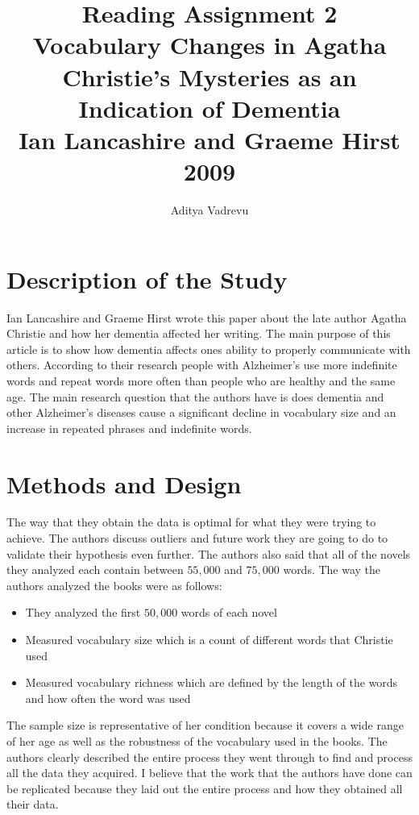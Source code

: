 \documentclass[journal, a4paper]{IEEEtran}
\begin{document}
	\title{Reading Assignment 2\\Vocabulary Changes in Agatha Christie’s Mysteries as an Indication of Dementia\\ Ian Lancashire and Graeme Hirst 2009}
	\author{Aditya Vadrevu}{}
	\maketitle
\section{Description of the Study} 
Ian Lancashire and Graeme Hirst wrote this paper about the late author Agatha Christie and how her dementia affected her writing. The main purpose of this article is to show how dementia affects ones ability to properly communicate with others. According to their research people with Alzheimer's use more indefinite words and repeat words more often than people who are healthy and the same age. The main research question that the authors have is does dementia and other Alzheimer's diseases cause a significant decline in vocabulary size and an increase in repeated phrases and indefinite words.

\section{Methods and Design}
The way that they obtain the data is optimal for what they were trying to achieve. The authors discuss outliers and future work they are going to do to validate their hypothesis even further. The authors also said that all of the novels they analyzed each contain between $55,000$ and $75,000$ words. The way the authors analyzed the books were as follows:
\begin{itemize}
\item They analyzed the first $50,000$ words of each novel
\item Measured vocabulary size which is a count of different words that Christie used
\item Measured vocabulary richness which are defined by the length of the words and how often the word was used
\end{itemize}
The sample size is representative of her condition because it covers a wide range of her age as well as the robustness of the vocabulary used in the books. 
The authors clearly described the entire process they went through to find and process all the data they acquired. I believe that the work that the authors have done can be replicated because they laid out the entire process and how they obtained all their data.
\end{document}
